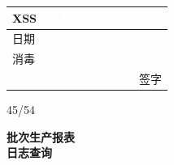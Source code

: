 \documentclass[UTF8,10pt,a4paper,fontset=fandol]{ctexart}
\newcommand{\handwritten}[1]{#1}
\begin{document}
\handwritten{}

\handwritten{}

\newpage

\begin{center}
\begin{tabular}{|p{1.6cm}|p{11.5cm}|p{1.6cm}|}
\hline
\centering\textsf{XSS} &
\multicolumn{1}{c|}{\textbf{\textcolor{white}{消毒灭菌记录表}}} &
\\
\hline
日期 & & \\
\hline
消毒 & & \\
\hline
\multicolumn{2}{c|}{} & 签字 \\
\hline
\end{tabular}
\end{center}

\begin{flushleft}
\scriptsize 45/54
\end{flushleft}

\newpage

\begin{center}
{\Large \textbf{批次生产报表}}\\[2pt]
\textbf{日志查询}
\end{center}
\end{document}

